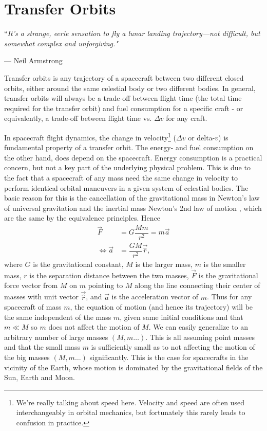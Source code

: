 \chapter{Transfer Orbits} \label{ch:transfer orbits}
\epigraph{``\itshape{It's a strange, eerie sensation to fly a lunar landing trajectory—not difficult, but somewhat complex and unforgiving.}"}{--- \textup{Neil Armstrong}}
Transfer orbits is any trajectory of a spacecraft between two different closed orbits, either around the same celestial body or two different bodies. In general, transfer orbits will always be a trade-off between flight time (the total time required for the transfer orbit) and fuel consumption for a specific craft - or equivalently, a trade-off between flight time vs. $\Delta v$ for any craft.

In spacecraft flight dynamics, the change in velocity\footnote{We're really talking about speed here. Velocity and speed are often used interchangeably in orbital mechanics, but fortunately this rarely leads to confusion in practice.} ($\Delta v$ or delta-$v$) is fundamental property of a transfer orbit. The energy- and fuel consumption on the other hand, does depend on the spacecraft. Energy consumption is a practical concern, but not a key part of the underlying physical problem. This is due to the fact that a spacecraft of any mass need the same change in velocity to perform identical orbital maneuvers in a given system of celestial bodies. The basic reason for this is the cancellation of the gravitational mass in Newton's law of universal gravitation and the inertial mass Newton's 2nd law of motion \cite{Knudsen2002}, which are the same by the equivalence principles. Hence
\begin{align}
\vec{F} &= G \dfrac{M m}{r^2} = m \vec{a} \\[0.3cm]
\Leftrightarrow \vec{a} &= \dfrac{G M}{r^2} \vec{\hat{r}} \label{eq:general-eom} ,
\end{align}
where $G$ is the gravitational constant, $M$ is the larger mass, $m$ is the smaller mass, $r$ is the separation distance between the two masses, $\vec{F}$ is the gravitational force vector from $M$ on $m$ pointing to $M$ along the line connecting their center of masses with unit vector $\vec{\hat{r}}$, and $\vec{a}$ is the acceleration vector of $m$. Thus for any spacecraft of mass $m$, the equation of motion (and hence its trajectory) will be the same independent of the mass $m$, given same initial conditions and that $m \ll M$ so $m$ does not affect the motion of $M$. We can easily generalize to an arbitrary number of large masses $(M, m \dots)$. This is all assuming point masses and that the small mass $m$ is sufficiently small as to not affecting the motion of the big masses $(M, m \dots)$ significantly. This is the case for spacecrafts in the vicinity of the Earth, whose motion is dominated by the gravitational fields of the Sun, Earth and Moon.

